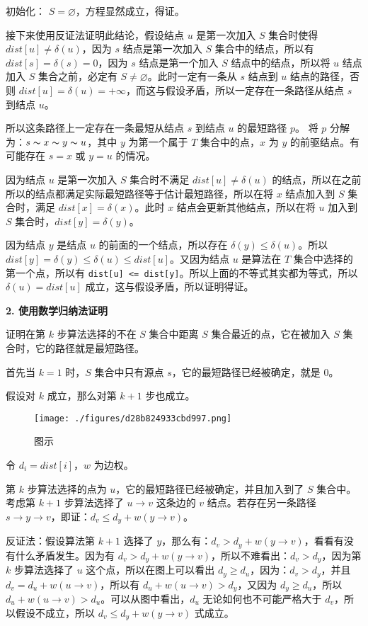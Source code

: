 初始化： $S = \varnothing$，方程显然成立，得证。

接下来使用反证法证明此结论，假设结点 $u$ 是第一次加入 $S$ 集合时使得 $dist[u] \neq \delta(u)$，因为 $s$ 结点是第一次加入 $S$ 集合中的结点，所以有 $dist[s] = \delta(s) = 0$，因为 $s$ 结点是第一个加入 $S$ 结点中的结点，所以将 $u$ 结点加入 $S$ 集合之前，必定有 $S \neq \varnothing$。此时一定有一条从 $s$ 结点到 $u$ 结点的路径，否则 $dist[u] = \delta(u) = +\infty$，而这与假设矛盾，所以一定存在一条路径从结点 $s$ 到结点 $u$。

所以这条路径上一定存在一条最短从结点 $s$ 到结点 $u$ 的最短路径 $p$。
将 $p$ 分解为：$s \thicksim x \thicksim y \thicksim u$，其中 $y$ 为第一个属于 $T$ 集合中的点，$x$ 为 $y$ 的前驱结点。有可能存在 $s = x$ 或 $y = u$ 的情况。

因为结点 $u$ 是第一次加入 $S$ 集合时不满足 $dist[u] \neq \delta(u)$ 的结点，所以在之前所以的结点都满足实际最短路径等于估计最短路径，所以在将 $x$ 结点加入到 $S$ 集合时，满足 $dist[x] = \delta(x)$。此时 $x$ 结点会更新其他结点，所以在将 $u$ 加入到 $S$ 集合时，$dist[y] = \delta(y)$。

因为结点 $y$ 是结点 $u$ 的前面的一个结点，所以存在 $\delta(y) \leq \delta(u)$。所以 $dist[y] = \delta(y) \leq \delta(u) \leq dist[u]$。又因为结点 $u$ 是算法在 $T$ 集合中选择的第一个点，所以有 \verb|dist[u] <= dist[y]|。所以上面的不等式其实都为等式，所以 $\delta(u) = dist[u]$ 成立，这与假设矛盾，所以证明得证。

\textbf{2. 使用数学归纳法证明}

证明在第 $k$ 步算法选择的不在 $S$ 集合中距离 $S$ 集合最近的点，它在被加入 $S$ 集合时，它的路径就是最短路径。

首先当 $k = 1$ 时，$S$ 集合中只有源点 $s$，它的最短路径已经被确定，就是 $0$。

假设对 $k$ 成立，那么对第 $k + 1$ 步也成立。

\begin{figure}[ht]
\centering
\texttt{[image: ./figures/d28b824933cbd997.png]}
\caption{图示} \label{fig_SSSP_1}
\end{figure}

令 $d_i = dist[i]$，$w$ 为边权。

第 $k$ 步算法选择的点为 $u$，它的最短路径已经被确定，并且加入到了 $S$ 集合中。考虑第 $k + 1$ 步算法选择了 $u \to v$ 这条边的 $v$ 结点。若存在另一条路径 $s \to y \to v$，即证：$d_v \leq d_y + w(y \to v)$。

反证法：假设算法第 $k + 1$ 选择了 $y$，那么有：$d_v > d_y + w(y \to v)$，看看有没有什么矛盾发生。因为有 $d_v > d_y + w(y \to v)$，所以不难看出：$d_v > d_y$，因为第 $k$ 步算法选择了 $u$ 这个点，所以在图上可以看出 $d_y \geq d_u$，因为：$d_v > d_y$，并且 $d_v = d_u + w(u \to v)$，所以有 $d_u + w(u \to v) > d_y$，又因为 $d_y \geq d_u$，所以 $d_u + w(u \to v) > d_u$。可以从图中看出，$d_u$ 无论如何也不可能严格大于 $d_v$，所以假设不成立，所以 $d_v \leq d_y + w(y \to v)$ 式成立。 

